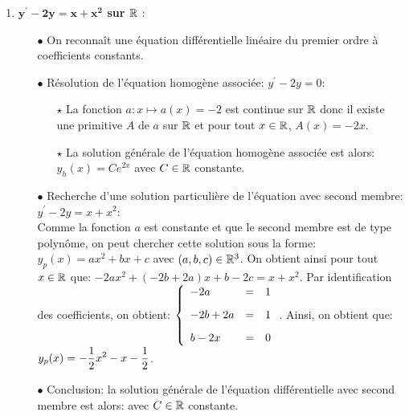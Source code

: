 \documentclass[a4paper, 11pt,reqno]{article}
\begin{document}
\begin{correction}
  \begin{enumerate}
    \item \textbf{$\mathbf{y^{\prime}-2y=x+x^2}$ sur $\mathbb{R}$} :\\
          \begin{itemize}
            \item[$\bullet$] On reconna\^{i}t une \'equation diff\'erentielle lin\'eaire du premier ordre \`{a} coefficients  constants.
            \item[$\bullet$] R\'esolution de l'\'equation homog\`{e}ne associ\'ee: $y^{\prime}-2y=0$:\\
                  \begin{itemize}
                    \item[$\star$] La fonction $a: x\mapsto a(x)=-2$ est continue sur $\mathbb{R}$ donc il existe une primitive $A$ de $a$ sur $\mathbb{R}$ et pour tout $x\in\mathbb{R}$, $A(x)=-2x$.
                    \item[$\star$] La solution g\'en\'erale de l'\'equation homog\`{e}ne associ\'ee est alors: $y_h(x) = Ce^{2x}$ avec $C\in\mathbb{R}$ constante.
                  \end{itemize}
            \item[$\bullet$] Recherche d'une solution particuli\`{e}re de l'\'equation avec second membre: $y^{\prime}-2y=x+x^2$:\\
                  \noindent Comme la fonction $a$ est constante et que le second membre est de type polyn\^{o}me, on peut chercher cette solution sous la forme: $y_p(x)= ax^2+bx+c$ avec $(a,b,c)\in\mathbb{R}^3$. On obtient ainsi pour tout $x\in\mathbb{R}$ que: $-2ax^2+(-2b+2a)x+b-2c=x+x^2$. Par identification des coefficients, on obtient:
                  $\left\lbrace \begin{array}{lll}  -2a&=&1\vsec\\ -2b+2a&=&1\vsec\\ b-2x&=&0\end{array} \right.$. Ainsi, on obtient que: $y_p(x)= -\displaystyle\frac{1}{2} x^2-x-\displaystyle\frac{1}{2}$.
            \item[$\bullet$] Conclusion: la solution g\'en\'erale de l'\'equation diff\'erentielle avec second membre est alors:  avec $C\in\mathbb{R}$ constante.
          \end{itemize}



\end{enumerate}
\end{correction}
\end{document}
